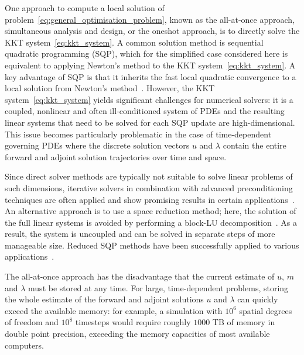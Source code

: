 \documentclass[prodmode,acmtoms]{acmsmall}
\begin{document}
One approach to compute a local solution of problem~\eqref{eq:general_optimisation_problem},
known as the all-at-once approach, simultaneous analysis and design, or the oneshot approach, is to directly solve the KKT system~\eqref{eq:kkt_system}. 
A common solution method is sequential quadratic programming (SQP), which for the simplified case considered here is equivalent to applying Newton's method to the KKT system~\eqref{eq:kkt_system}.
A key advantage of SQP is that it inherits the fast local quadratic convergence to a local solution from Newton's method~\cite{boggs1996}.
However, the KKT system~\eqref{eq:kkt_system} yields significant challenges for numerical solvers:
it is a coupled, nonlinear and often ill-conditioned system of PDEs and the resulting linear systems that need to be solved for each SQP update are high-dimensional.
This issue becomes particularly problematic in the case of time-dependent governing PDEs where the discrete solution vectors $u$ and $\lambda$ contain the entire forward and adjoint solution trajectories over time and space.

Since direct solver methods are typically not suitable to solve linear problems of such dimensions, 
iterative solvers in combination with advanced preconditioning techniques are often applied and show promising results in certain applications~\cite{battermann2001,biros2000,schoeberl2007}.
An alternative approach is to use a space reduction method; here, the solution of the full linear systems is avoided 
by performing a block-LU decomposition~\cite{byrd1991,biegler1995,schulz1998}. 
As a result, the system is uncoupled and can be solved in separate steps of more manageable size.
Reduced SQP methods have been successfully applied to various applications~\cite{kupfer1992,orozco1992,orozco1997}. 


The all-at-once approach has the disadvantage that the current estimate of $u$, $m$ and $\lambda$ must be stored at any time. 
For large, time-dependent problems, storing the whole estimate of the forward and adjoint solutions $u$ and $\lambda$ can quickly exceed the available memory:
for example, a simulation with $10^6$ spatial degrees of freedom and $10^8$ timesteps would require roughly $1000$ TB of memory in double point precision, 
exceeding the memory capacities of most available computers.
\end{document}

